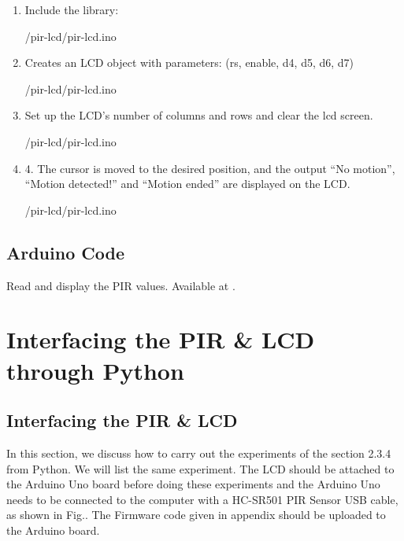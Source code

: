 \begin{enumerate}
  \item Include the library: 
        
        {\LocLDRardcode/pir-lcd/pir-lcd.ino}
\item Creates an LCD object with parameters: (rs, enable, d4, d5, d6, d7)
        
        {\LocLDRardcode/pir-lcd/pir-lcd.ino}
\item Set up the LCD's number of columns and rows and clear the lcd screen.
        
        {\LocLDRardcode/pir-lcd/pir-lcd.ino}
\item 4.	The cursor is moved to the desired position, and the output “No motion”, “Motion detected!” and “Motion ended” are displayed on the LCD.
        
        {\LocLDRardcode/pir-lcd/pir-lcd.ino}
 

\end{enumerate}


\subsection{Arduino Code}
\label{sec:ldr-arduino-code}

\begin{ardcode}
  {Read and display the PIR values.  Available at
    .}
  \label{ard:ldr-read}
  
\end{ardcode}





\section{Interfacing the PIR \& LCD through Python}
\subsection{Interfacing the PIR \& LCD}
In this section, we discuss how to carry out the experiments of the section 2.3.4 from Python. We will list the same experiment. The LCD should be attached to the Arduino Uno board before doing these experiments and the Arduino Uno needs to be connected to the computer with a HC-SR501 PIR Sensor USB cable, as shown in Fig.. The Firmware code given in appendix should be uploaded to the Arduino board.

